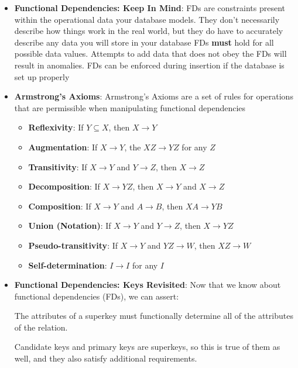 \documentclass{report}
\begin{document}
\begin{itemize}
\begin{itemize}
            \end{itemize}
        \item \textbf{Functional Dependencies: Keep In Mind}: FDs are constraints present within the operational data your database models. They don't necessarily describe how things work in the real world, but they do have to accurately describe any data you will store in your database
            \bigbreak \noindent 
            FDs \textbf{must} hold for all possible data values. Attempts to add data that does not obey the FDs will result in anomalies.
            \bigbreak \noindent 
            FDs can be enforced during insertion if the database is set up properly
        \item \textbf{Armstrong's Axioms}: Armstrong's Axioms are a set of rules for operations that are permissible when manipulating functional dependencies
            \begin{itemize}
                \item \textbf{Reflexivity}: If $Y \subseteq X$, then $X \to Y $
                \item \textbf{Augmentation}: If $X \to Y$, the $XZ \to YZ$ for any $Z$
                \item \textbf{Transitivity}: If $X \to Y$ and $Y \to Z$, then $X \to Z $
                \item \textbf{Decomposition}: If $X \to YZ$, then $X \to Y$ and $X \to Z $
                \item \textbf{Composition}: If $X \to Y$ and $A \to B$, then $XA \to YB $
                \item \textbf{Union (Notation)}: If $X\to Y$ and $Y \to Z$, then $X \to YZ $
                \item \textbf{Pseudo-transitivity}: If $X \to Y$ and $YZ \to W$, then $XZ \to W $
                \item \textbf{Self-determination}: $I \to I $ for any $I$
            \end{itemize}
        \item \textbf{Functional Dependencies: Keys Revisited}: Now that we know about functional dependencies (FDs), we can assert:
            \bigbreak \noindent 
            \begin{center}
                The attributes of a superkey must functionally determine all of the attributes of the relation.
            \end{center}
            \bigbreak \noindent 
            Candidate keys and primary keys are superkeys, so this is true of them as well, and they also satisfy additional requirements.

\end{itemize}
\end{document}
